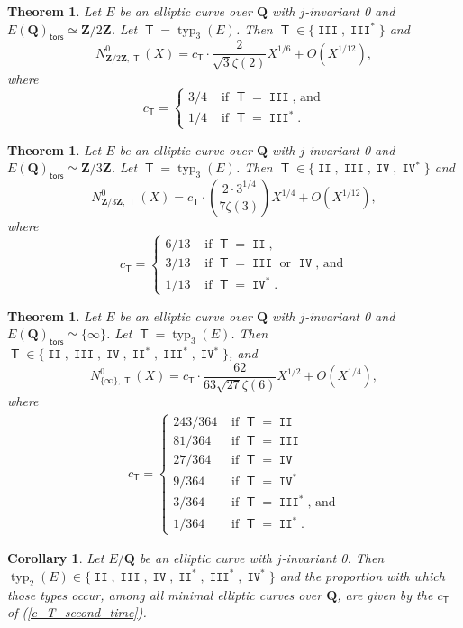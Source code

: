 \documentclass{amsart}
\newcommand{\Z}{\mathbf{Z}}
\newcommand{\Q}{\mathbf{Q}}
\newcommand{\T}{\operatorname{\mathsf{T}}}
\newcommand{\tors}{\mathsf{tors}}
\DeclareMathOperator{\typ}{{typ}}
\DeclareMathOperator{\II}{\mathtt{II}}
\DeclareMathOperator{\III}{\mathtt{III}}
\DeclareMathOperator{\IV}{\mathtt{IV}}
\numberwithin{equation}{section}
\theoremstyle{plain}
\newtheorem{thm}[equation]{Theorem}
\newtheorem{cor}[equation]{Corollary}
\theoremstyle{remark}
\begin{document}
\begin{thm} \label{j=0_tors=2}
Let $E$ be an elliptic curve over $\Q$ with $j$-invariant 0 and $E(\Q)_\tors \simeq \Z/2\Z$. Let $\T = \typ_3(E)$.   Then $\T \in \lbrace \III,\III^* \rbrace$ and 
\[
N_{\Z/2\Z,\T}^0(X) = c_{\T} \cdot \frac{2}{\sqrt{3}\zeta(2)} X^{1/6} + O(X^{1/12}),
\]
where 
\[
c_{\T} = \begin{cases} 3/4 & \text{ if $\T = \III$, and} \\ 1/4 & \text{ if $\T = \III^*$}. \end{cases}
\]
\end{thm}

\begin{thm} \label{j=0_tors=3}
Let $E$ be an elliptic curve over $\Q$ with $j$-invariant 0 and $E(\Q)_\tors \simeq \Z/3\Z$. Let $\T = \typ_3(E)$.   Then $\T \in \lbrace \II, \III, \IV, \IV^* \rbrace$ and 
\[
N_{\Z/3\Z,\T}^0(X) = c_{\T} \cdot \left( \frac{2\cdot3^{1/4}}{7\zeta(3)} \right) X^{1/4} + O(X^{1/12}),
\]
where 
\[
c_{\T} = 
\begin{cases} 
6/13 & \text{ if $\T = \II$}, \\
3/13 & \text{ if $\T = \III$ or $\IV$, and}  \\
1/13 & \text{ if $\T = \IV^*$.}
\end{cases}
\]
\end{thm}

\begin{thm}  \label{j=0_tors=0}
Let $E$ be an elliptic curve over $\Q$ with $j$-invariant 0 and $E(\Q)_\tors \simeq \lbrace \infty \rbrace$. Let $\T = \typ_3(E)$.   Then $\T \in \lbrace \II, \III, \IV, \II^*,\III^*,\IV^* \rbrace$, and
\[
N_{\lbrace \infty \rbrace ,\T}^0(X) = c_{\T} \cdot \frac{62}{63\sqrt{27}\zeta(6)} X^{1/2} + O(X^{1/4}),
\]
where 
\begin{align} \label{c_T_second_time}
c_{\T} = 
\begin{cases} 
243/364 & \text{ if $\T = \II$} \\
81/364& \text{ if $\T = \III$} \\
27/364& \text{ if $\T = \IV$} \\
9/364& \text{ if $\T = \IV^*$} \\
3/364& \text{ if $\T = \III^*$, and} \\
1/364& \text{ if $\T = \II^*$}.
\end{cases}
\end{align}
\end{thm}

\begin{cor}
Let $E/\Q$ be an elliptic curve with $j$-invariant 0.  Then $\typ_2(E) \in \lbrace \II, \III, \IV, \II^*, \III^{*},\IV^{*} \rbrace$ and the proportion with which those types  occur, among all minimal elliptic curves over $\Q$, are given by the $c_{\T}$ of (\ref{c_T_second_time}).
\end{cor}
\end{document}
